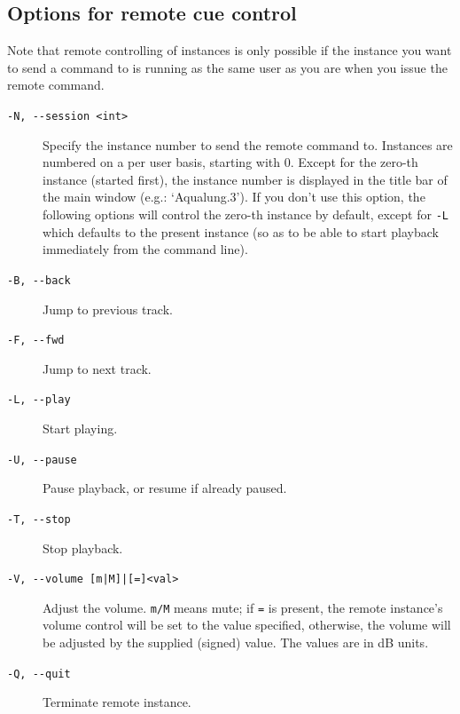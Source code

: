 \documentclass[10pt,english]{article}
\begin{document}
\subsection{Options for remote cue control\label{idp413264}}



\noindent Note that remote controlling of instances is only possible
if the instance you want to send a command to is running as
the same user as you are when you issue the remote command.


\begin{description}

\item [
\texttt{-N, {-}{-}session <int>}
]

Specify the instance number to send the remote command
to. Instances are numbered on a per user basis, starting
with 0. Except for the zero-th instance (started first), the
instance number is displayed in the title bar of the main
window (e.g.: `Aqualung.3'). If you don't use this
option, the following options will control the zero-th
instance by default, except for \texttt{-L} which defaults
to the present instance (so as to be able to start playback
immediately from the command line).

\item [
\texttt{-B, {-}{-}back}
]

Jump to previous track.

\item [
\texttt{-F, {-}{-}fwd}
]

Jump to next track.

\item [
\texttt{-L, {-}{-}play}
]

Start playing.

\item [
\texttt{-U, {-}{-}pause}
]

Pause playback, or resume if already paused.

\item [
\texttt{-T, {-}{-}stop}
]

Stop playback.

\item [
\texttt{-V, {-}{-}volume [m|M]|[=]<val>}
]

Adjust the volume. \texttt{m/M} means
mute; if \texttt{=} is present, the remote instance's
volume control will be set to the value specified,
otherwise, the volume will be adjusted by the supplied
(signed) value. The values are in dB units.

\item [
\texttt{-Q, {-}{-}quit}
]

Terminate remote instance.

\end{description}
\end{document}
